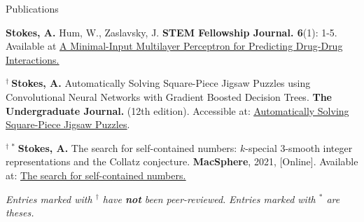 \begin{rSection}{Publications}
\begin{enumerate}[label={[\arabic*]}]
  \item {\bf Stokes, A.} Hum, W., Zaslavsky, J. \textbf{STEM Fellowship Journal. 6}(1): 1-5. Available at \underline{\href{https://journal.stemfellowship.org/doi/10.17975/sfj-2020-006}{A Minimal-Input Multilayer Perceptron for Predicting Drug-Drug Interactions.}}
  \item $^\dagger \ ${\bf Stokes, A.} Automatically Solving Square-Piece Jigsaw Puzzles using Convolutional Neural Networks with Gradient Boosted Decision Trees. \textbf{The Undergraduate Journal.} (12th edition). Accessible at: \underline{\href{https://gua.soutron.net/Portal/Default/en-GB/RecordView/Index/61}{Automatically Solving Square-Piece Jigsaw Puzzles}}.
  \item $^{\dagger \ \ast \ }${\bf Stokes, A.} The search for self-contained numbers: $k$-special 3-smooth integer representations and the Collatz conjecture. \textbf{MacSphere}, 2021, [Online]. Available at: \underline{\href{https://macsphere.mcmaster.ca/handle/11375/27543}{The search for self-contained numbers.}}

\end{enumerate}

\smallskip
\emph{Entries marked with $^\dagger$ have \textbf{not} been peer-reviewed.} \hfill
\emph{Entries marked with $^\ast$ are theses.}

\end{rSection}
